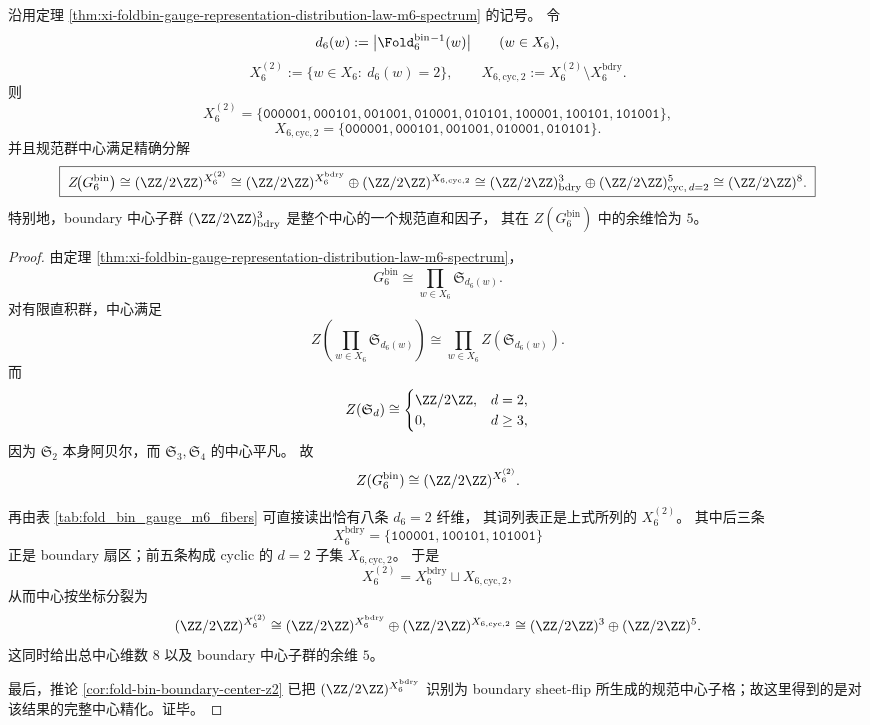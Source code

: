 \begin{theorem}\label{thm:xi-window6-center-exact-splitting-bdry-cyclic}
沿用定理 \ref{thm:xi-foldbin-gauge-representation-distribution-law-m6-spectrum} 的记号。
令
\[
d_6(w):=\bigl|\Fold_6^{\mathrm{bin}}{}^{-1}(w)\bigr|
\qquad(w\in X_6),
\]
\[
X_6^{(2)}:=\{w\in X_6:\ d_6(w)=2\},
\qquad
X_{6,\mathrm{cyc},2}:=X_6^{(2)}\setminus X_6^{\mathrm{bdry}}.
\]
则
\[
X_6^{(2)}
=
\{\texttt{000001},\texttt{000101},\texttt{001001},\texttt{010001},\texttt{010101},
\texttt{100001},\texttt{100101},\texttt{101001}\},
\]
\[
X_{6,\mathrm{cyc},2}
=
\{\texttt{000001},\texttt{000101},\texttt{001001},\texttt{010001},\texttt{010101}\}.
\]
并且规范群中心满足精确分解
\[
\boxed{\;
Z\!\bigl(G_6^{\mathrm{bin}}\bigr)
\cong
(\ZZ/2\ZZ)^{X_6^{(2)}}
\cong
(\ZZ/2\ZZ)^{X_6^{\mathrm{bdry}}}
\oplus
(\ZZ/2\ZZ)^{X_{6,\mathrm{cyc},2}}
\cong
(\ZZ/2\ZZ)^3_{\mathrm{bdry}}
\oplus
(\ZZ/2\ZZ)^5_{\mathrm{cyc},\,d=2}
\cong
(\ZZ/2\ZZ)^8.\;}
\]
特别地，boundary 中心子群 \((\ZZ/2\ZZ)^3_{\mathrm{bdry}}\) 是整个中心的一个规范直和因子，
其在 \(Z(G_6^{\mathrm{bin}})\) 中的余维恰为 \(5\)。
\end{theorem}
\begin{proof}
由定理 \ref{thm:xi-foldbin-gauge-representation-distribution-law-m6-spectrum}，
\[
G_6^{\mathrm{bin}}\cong \prod_{w\in X_6}\mathfrak S_{d_6(w)}.
\]
对有限直积群，中心满足
\[
Z\!\left(\prod_{w\in X_6}\mathfrak S_{d_6(w)}\right)
\cong
\prod_{w\in X_6} Z\!\left(\mathfrak S_{d_6(w)}\right).
\]
而
\[
Z(\mathfrak S_d)\cong
\begin{cases}
\ZZ/2\ZZ,& d=2,\\
0,& d\ge 3,
\end{cases}
\]
因为 \(\mathfrak S_2\) 本身阿贝尔，而 \(\mathfrak S_3,\mathfrak S_4\) 的中心平凡。
故
\[
Z(G_6^{\mathrm{bin}})\cong (\ZZ/2\ZZ)^{X_6^{(2)}}.
\]
\par
再由表 \ref{tab:fold_bin_gauge_m6_fibers} 可直接读出恰有八条 \(d_6=2\) 纤维，
其词列表正是上式所列的 \(X_6^{(2)}\)。
其中后三条
\[
X_6^{\mathrm{bdry}}=\{\texttt{100001},\texttt{100101},\texttt{101001}\}
\]
正是 boundary 扇区；前五条构成 cyclic 的 \(d=2\) 子集 \(X_{6,\mathrm{cyc},2}\)。
于是
\[
X_6^{(2)}=X_6^{\mathrm{bdry}}\sqcup X_{6,\mathrm{cyc},2},
\]
从而中心按坐标分裂为
\[
(\ZZ/2\ZZ)^{X_6^{(2)}}
\cong
(\ZZ/2\ZZ)^{X_6^{\mathrm{bdry}}}
\oplus
(\ZZ/2\ZZ)^{X_{6,\mathrm{cyc},2}}
\cong
(\ZZ/2\ZZ)^3\oplus (\ZZ/2\ZZ)^5.
\]
这同时给出总中心维数 \(8\) 以及 boundary 中心子群的余维 \(5\)。
\par
最后，推论 \ref{cor:fold-bin-boundary-center-z2} 已把
\((\ZZ/2\ZZ)^{X_6^{\mathrm{bdry}}}\)
识别为 boundary sheet-flip 所生成的规范中心子格；故这里得到的是对该结果的完整中心精化。证毕。
\end{proof}

\endinput
